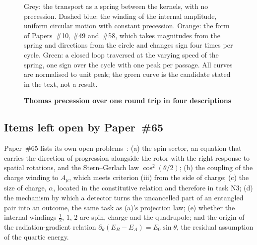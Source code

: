 \documentclass[%
 reprint, amsmath,amssymb, aps, prb, ]{revtex4-2}
\numberwithin{equation}{section}
\newcommand{\OmT}{\Omega_{\text{T}}}
\begin{document}
\begin{figure}[t!]
\centering
{}
\caption{\textbf{Thomas precession over one round trip in four descriptions}}
\label{fig:frames}
\vspace{0.4em}
\begin{minipage}{0.95\columnwidth}
\justifying\small
Grey: the transport as a spring between the kernels, with no precession. Dashed blue: the winding of the internal amplitude, uniform circular motion with constant precession. Orange: the form of Papers~\#10, \#49 and~\#58, which takes magnitudes from the spring and directions from the circle and changes sign four times per cycle. Green: a closed loop traversed at the varying speed of the spring, one sign over the cycle with one peak per passage. All curves are normalised to unit peak; the green curve is the candidate stated in the text, not a result.
\end{minipage}
\end{figure}

\subsection{Items left open by Paper~\#65}

Paper~\#65 lists its own open problems~\cite{hanamura65}: (a) the spin sector, an equation that carries the direction of progression alongside the rotor with the right response to spatial rotations, and the Stern--Gerlach law $\cos^{2}(\theta/2)$; (b) the coupling of the charge winding to $A_\mu$, which meets criterion (iii) from the side of charge; (c) the size of charge, $\alpha$, located in the constitutive relation and therefore in task N3; (d) the mechanism by which a detector turns the uncancelled part of an entangled pair into an outcome, the same task as (a)'s projection law; (e) whether the internal windings $\tfrac12$, $1$, $2$ are spin, charge and the quadrupole; and the origin of the radiation-gradient relation $\partial_\theta(E_B-E_A) = E_0\sin\theta$, the residual assumption of the quartic energy.
\end{document}
